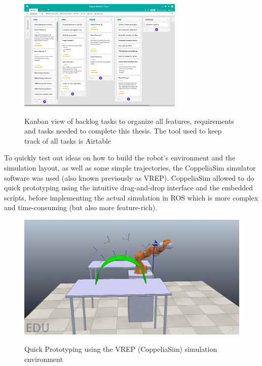 \begin{center}
\begin{figure}[htbp]
\centering
\includegraphics[width=0.7\textwidth]{images/task-backlog-airtable.png}\\
\caption{Kanban view of backlog tasks to organize all features, requirements and tasks needed to complete this thesis. The tool used to keep track of all tasks is Airtable}
\end{figure}
\end{center}

To quickly test out ideas on how to build the robot's environment and the simulation layout, as well as some simple trajectories, the CoppeliaSim simulator software was used (also known previously as VREP). CoppeliaSim allowed to do quick prototyping using the intuitive drag-and-drop interface and the embedded scripts, before implementing the actual simulation in ROS which is more complex and time-consuming (but also more feature-rich).

\begin{center}
\begin{figure}[!htb]
\centering
\includegraphics[width=\textwidth]{images/quick-vrep-prototyping.png}\\
\caption{Quick Prototyping using the VREP (CoppeliaSim) simulation environment}
\end{figure}
\end{center}
